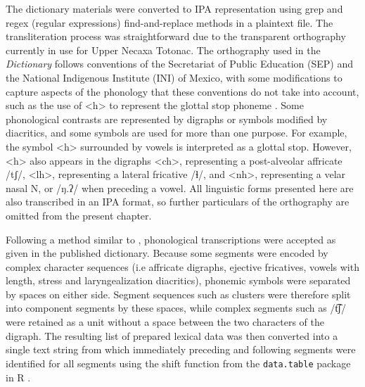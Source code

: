 \documentclass[output=paper,colorlinks,citecolor=brown]{langscibook}
\begin{document}
The dictionary materials were converted to IPA representation using grep and regex (regular expressions) find-and-replace methods in a plaintext file. The transliteration process was straightforward due to the transparent orthography currently in use for Upper Necaxa Totonac. The orthography used in the \textit{Dictionary} follows conventions of the Secretariat of Public Education (SEP) and the National Indigenous Institute (INI) of Mexico, with some modifications to capture aspects of the phonology that these conventions do not take into account, such as the use of <h> to represent the glottal stop phoneme \citep{Beck2011}. Some phonological contrasts are represented by digraphs or symbols modified by diacritics, and some symbols are used for more than one purpose. For example, the symbol <h> surrounded by vowels is interpreted as a glottal stop. However, <h> also appears in the digraphs <ch>, representing a post-alveolar affricate {/tʃ/}, <lh>, representing a lateral fricative {/ɬ/}, and <nh>, representing a velar nasal {N}, or {/ŋ.ʔ/} when preceding a vowel. All linguistic forms presented here are also transcribed in an IPA format, so further particulars of the orthography are omitted from the present chapter.

Following a method similar to \citet{Bauer2015}, phonological transcriptions were accepted as given in the published dictionary. Because some segments were encoded by complex character sequences (i.e affricate digraphs, ejective fricatives, vowels with length, stress and laryngealization diacritics), phonemic symbols were separated by spaces on either side. Segment sequences such as clusters were therefore split into component segments by these spaces, while complex segments such as {/t͡ʃ/} were retained as a unit without a space between the two characters of the digraph. The resulting list of prepared lexical data was then converted into a single text string from which immediately preceding and following segments were identified for all segments using the shift function from the \texttt{data.table} package \citep{Dowle2017} in R \citep{R2017}.
\end{document}
